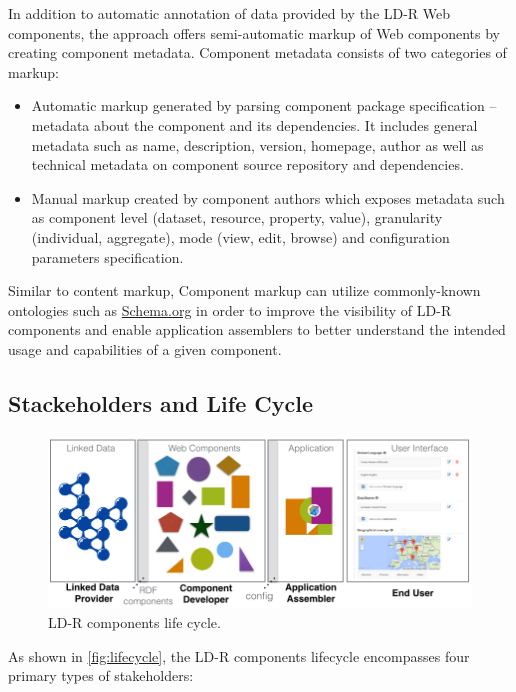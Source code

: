 \documentclass{acm_proc_article-sp}
\begin{document}
In addition to automatic annotation of data provided by the LD-R Web components, the approach offers semi-automatic markup of Web components by creating component metadata. 
Component metadata consists of two categories of markup:
\begin{itemize}
\item Automatic markup generated by parsing component package specification -- metadata about the component and its dependencies. It includes general metadata such as name, description, version, homepage, author as well as technical metadata on component source repository and dependencies.

\item Manual markup created by component authors which exposes metadata such as component level (dataset, resource, property, value), granularity (individual, aggregate), mode (view, edit, browse) and configuration parameters specification.

\end{itemize}

Similar to content markup, Component markup can utilize commonly-known ontologies such as \url{Schema.org} in order to improve the visibility of LD-R components and enable application assemblers to better understand the intended usage and capabilities of a given component.

\subsection{Stackeholders and Life Cycle}
\begin{figure}[tb]
  \includegraphics[width=1\linewidth]{images/lifecycle.jpg}
  \caption{LD-R components life cycle.}
  \label{fig:lifecycle}
\end{figure}

As shown in \autoref{fig:lifecycle}, the LD-R components lifecycle encompasses four primary types of stakeholders:
\end{document}
